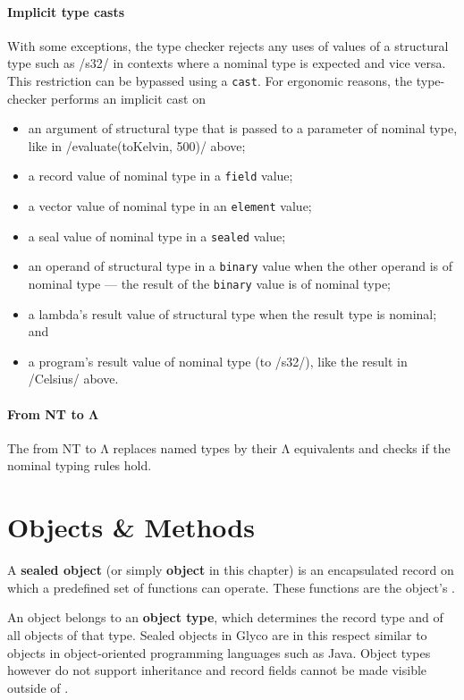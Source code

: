 \documentclass[main.tex]{subfiles}
\begin{document}
\paragraph{Implicit type casts} With some exceptions, the type checker rejects any uses of values of a structural type such as \iil/s32/ in contexts where a nominal type is expected and vice versa. This restriction can be bypassed using a \texttt{cast}. For ergonomic reasons, the type-checker performs an implicit cast on
\begin{itemize}[nosep]
	\item an argument of structural type that is passed to a parameter of nominal type, like in \iil/evaluate(toKelvin, 500)/ above;
	\item a record value of nominal type in a \texttt{field} value;
	\item a vector value of nominal type in an \texttt{element} value;
	\item a seal value of nominal type in a \texttt{sealed} value;
	\item an operand of structural type in a \texttt{binary} value when the other operand is of nominal type — the result of the \texttt{binary} value is of nominal type;
	\item a lambda's result value of structural type when the result type is nominal; and
	\item a program's result value of nominal type (to \iil/s32/), like the result in \iil/Celsius/ above.
\end{itemize}

\paragraph{From NT to Λ} The  from NT to Λ replaces named types by their Λ equivalents and checks if the nominal typing rules hold.

\section{Objects \& Methods} \label{sct:obj-meth}
A \textbf{sealed object} (or simply \textbf{object} in this chapter) is an encapsulated record on which a predefined set of functions can operate. These functions are the object's \textbf{}.

An object belongs to an \textbf{object type}, which determines the record type and  of all objects of that type. Sealed objects in Glyco are in this respect similar to objects in object-oriented programming languages such as Java. Object types however do not support inheritance and record fields cannot be made visible outside of .
\end{document}
